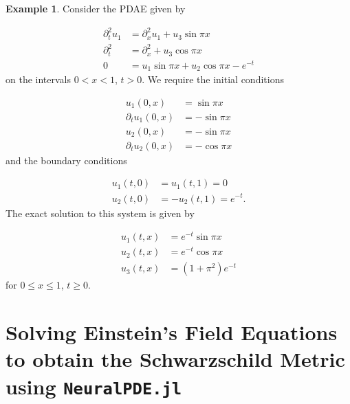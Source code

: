 \documentclass{CUP-JNL-DTM}%
\theoremstyle{definition}
\newtheorem{example}[theorem]{Example}
\numberwithin{equation}{section}
\begin{document}
\begin{example}

Consider the PDAE given by 

\begin{equation}
    \begin{split}
        \partial_t^2 u_1 & = \partial_x^2 u_1 + u_3 \sin \pi x \\
        \partial_t^2 & = \partial_x^2 + u_3 \cos \pi x \\
        0 & = u_1 \sin \pi x + u_2 \cos \pi x - e^{-t}
    \end{split}
\end{equation}
on the intervals $0 < x < 1$, $t > 0$. We require the initial conditions

\begin{equation}
    \begin{split}
        u_1(0,x) & = \sin \pi x \\
        \partial_t u_1(0,x) & = -\sin \pi x \\
        u_2(0,x) & = -\sin \pi x \\
        \partial_t u_2(0,x) & = -\cos \pi x
    \end{split}
\end{equation}
and the boundary conditions

\begin{equation}
    \begin{split}
        u_1(t,0) & = u_1(t,1) = 0 \\
        u_2(t,0) & = -u_2(t,1) = e^{-t}. 
    \end{split}
\end{equation}
The exact solution to this system is given by 

\begin{equation}
    \begin{split}
        u_1(t,x) & = e^{-t}\sin \pi x \\
        u_2(t,x) & = e^{-t}\cos \pi x \\
        u_3(t,x) & = (1+\pi^2)e^{-t}
    \end{split}
\end{equation}
for $0 \le x \le 1$, $t \ge 0$. 

\end{example}

\section{Solving Einstein's Field Equations to obtain the Schwarzschild Metric using \texttt{NeuralPDE.jl}}
\end{document}
